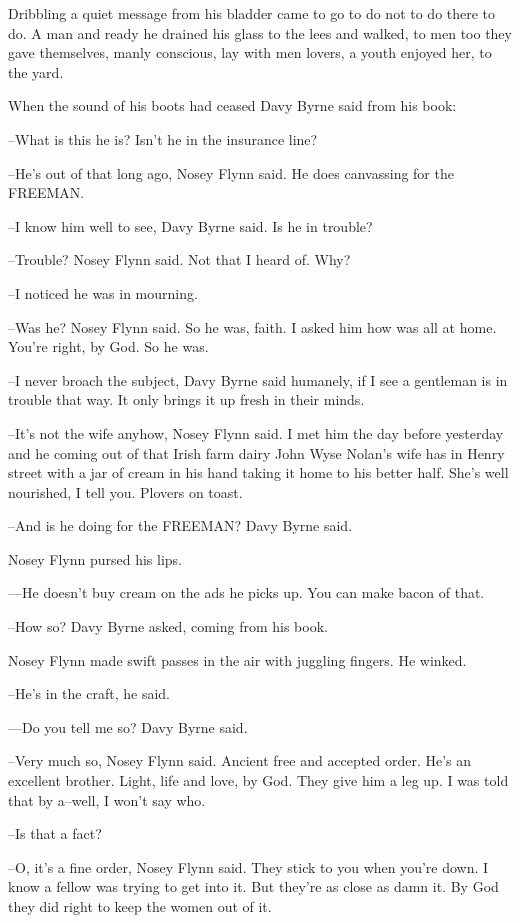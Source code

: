 Dribbling a quiet message from his bladder came to go to do not to do
there to do. A man and ready he drained his glass to the lees and walked,
to men too they gave themselves, manly conscious, lay with men lovers, a
youth enjoyed her, to the yard.

When the sound of his boots had ceased Davy Byrne said from his book:

--What is this he is? Isn't he in the insurance line?

--He's out of that long ago, Nosey Flynn said. He does canvassing for the
FREEMAN.

--I know him well to see, Davy Byrne said. Is he in trouble?

--Trouble? Nosey Flynn said. Not that I heard of. Why?

--I noticed he was in mourning.

--Was he? Nosey Flynn said. So he was, faith. I asked him how was all at
home. You're right, by God. So he was.

--I never broach the subject, Davy Byrne said humanely, if I see a
gentleman is in trouble that way. It only brings it up fresh in their
minds.

--It's not the wife anyhow, Nosey Flynn said. I met him the day before
yesterday and he coming out of that Irish farm dairy John Wyse Nolan's
wife has in Henry street with a jar of cream in his hand taking it home
to his better half. She's well nourished, I tell you. Plovers on toast.

--And is he doing for the FREEMAN? Davy Byrne said.

Nosey Flynn pursed his lips.

---He doesn't buy cream on the ads he picks up. You can make bacon of
that.

--How so? Davy Byrne asked, coming from his book.

Nosey Flynn made swift passes in the air with juggling fingers. He
winked.

--He's in the craft, he said.

---Do you tell me so? Davy Byrne said.

--Very much so, Nosey Flynn said. Ancient free and accepted order. He's
an excellent brother. Light, life and love, by God. They give him a leg
up. I was told that by a--well, I won't say who.

--Is that a fact?

--O, it's a fine order, Nosey Flynn said. They stick to you when you're
down. I know a fellow was trying to get into it. But they're as close as
damn it. By God they did right to keep the women out of it.

